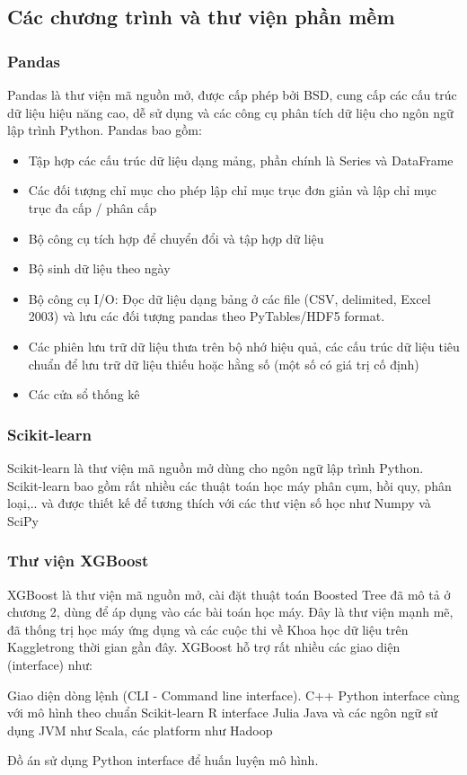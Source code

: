 \subsection{Các chương trình và thư viện phần mềm}
\subsubsection*{Pandas}
Pandas là thư viện mã nguồn mở, được cấp phép bởi BSD, cung cấp các cấu trúc dữ liệu hiệu năng cao, dễ sử dụng và các công cụ phân tích dữ liệu cho ngôn ngữ lập trình Python.
Pandas bao gồm:
\begin{itemize}
    \item Tập hợp các cấu trúc dữ liệu dạng mảng, phần chính là Series và DataFrame
    \item Các đối tượng chỉ mục cho phép lập chỉ mục trục đơn giản và lập chỉ mục trục đa cấp / phân cấp
    \item Bộ công cụ tích hợp để chuyển đổi và tập hợp dữ liệu
    \item Bộ sinh dữ liệu theo ngày
    \item Bộ công cụ I/O: Đọc dữ liệu dạng bảng ở các file (CSV, delimited, Excel 2003) và lưu các đối tượng pandas theo PyTables/HDF5 format.
    \item Các phiên lưu trữ dữ liệu thưa trên bộ nhớ hiệu quả, các cấu trúc dữ liệu tiêu chuẩn để lưu trữ dữ liệu thiếu hoặc hằng số (một số có giá trị cố định)
    \item Các cửa sổ thống kê
\end{itemize}

\subsubsection*{Scikit-learn}
Scikit-learn là thư viện mã nguồn mở dùng cho ngôn ngữ lập trình Python. Scikit-learn bao gồm rất nhiều các thuật toán học máy phân cụm, hồi quy, phân loại,.. và được thiết kế để tương thích với các thư viện số học như Numpy \cite{numpy} và SciPy \cite{scipy} 
\subsubsection*{Thư viện XGBoost}
XGBoost\cite{4} là thư viện mã nguồn mở, cài đặt thuật toán Boosted Tree đã mô tả ở chương 2, dùng để áp dụng vào các bài toán học máy. Đây là thư viện mạnh mẽ, đã thống trị học máy ứng dụng và các cuộc thi về Khoa học dữ liệu trên Kaggle\cite{15}trong thời gian gần đây. XGBoost hỗ trợ rất nhiều các giao diện (interface) như:
\begin{itemize}
\ii Giao diện dòng lệnh (CLI - Command line interface).
\ii C++
\ii Python interface cùng với mô hình theo chuẩn Scikit-learn
\ii R interface
\ii Julia
\ii Java và các ngôn ngữ sử dụng JVM như Scala, các platform như Hadoop
\end{itemize}
Đồ án sử dụng Python interface để huấn luyện mô hình.

